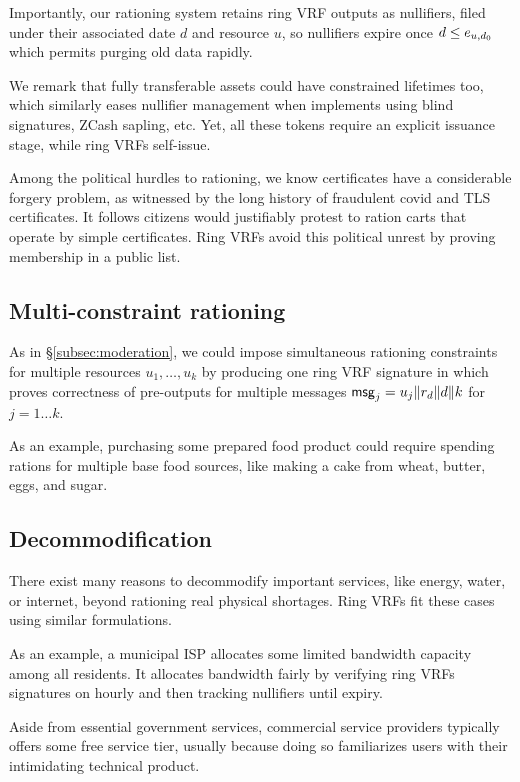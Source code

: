 Importantly, our rationing system retains ring VRF outputs as nullifiers,
filed under their associated date $d$ and resource $u$, so nullifiers
expire once $d \le e_{u,d_0}$ which permits purging old data rapidly.

We remark that fully transferable assets could have constrained lifetimes
too, which similarly eases nullifier management when implements using
blind signatures, ZCash sapling, etc.  Yet, all these tokens require
an explicit issuance stage, while ring VRFs self-issue.

Among the political hurdles to rationing, we know certificates have
a considerable forgery problem, as witnessed by the long history of
fraudulent covid and TLS certificates.  It follows citizens would
justifiably protest to ration carts that operate by simple certificates.
Ring VRFs avoid this political unrest by proving membership in a public list.


\subsection{Multi-constraint rationing}
\label{subsec:multi_io}

As in \S\ref{subsec:moderation}, we could impose simultaneous rationing
constraints for multiple resources $u_1,\ldots,u_k$ by producing one
ring VRF signature in which \PedVRF proves correctness of pre-outputs
for multiple messages 
 $\mathsf{msg}_j = u_j \| r_d \| d \| k$ for $j=1 \ldots k$.

As an example, purchasing some prepared food product could require spending
rations for multiple base food sources, like making a cake from wheat, butter,
eggs, and sugar.  


\subsection{Decommodification}

There exist many reasons to decommodify important services, like
energy, water, or internet, beyond rationing real physical shortages.
Ring VRFs fit these cases using similar \msg formulations.

As an example, a municipal ISP allocates some limited bandwidth capacity
among all residents.  It allocates bandwidth fairly by verifying ring VRFs
signatures on hourly \msg and then tracking nullifiers until expiry.

Aside from essential government services, commercial service providers
typically offers some free service tier, usually because doing so
familiarizes users with their intimidating technical product.

